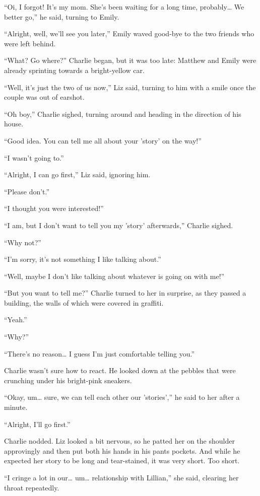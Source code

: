 “Oi, I forgot! It's my mom. She's been waiting for a long time, probably… We better go,” he said, turning to Emily.

“Alright, well, we'll see you later,” Emily waved good-bye to the two friends who were left behind.

“What? Go where?” Charlie began, but it was too late: Matthew and Emily were already sprinting towards a bright-yellow car.

“Well, it's just the two of us now,” Liz said, turning to him with a smile once the couple was out of earshot.

“Oh boy,” Charlie sighed, turning around and heading in the direction of his house.

“Good idea. You can tell me all about your 'story' on the way!”

“I wasn't going to.”

“Alright, I can go first,” Liz said, ignoring him.

“Please don't.”

“I thought you were interested!”

“I am, but I don't want to tell you my 'story' afterwards,” Charlie sighed.

“Why not?”

“I'm sorry, it's not something I like talking about.”

“Well, maybe I don't like talking about whatever is going on with me!”

“But you want to tell me?” Charlie turned to her in surprise, as they passed a building, the walls of which were covered in graffiti.

“Yeah.”

“Why?”

“There's no reason… I guess I'm just comfortable telling you.”

Charlie wasn't sure how to react. He looked down at the pebbles that were crunching under his bright-pink sneakers.

“Okay, um… sure, we can tell each other our 'stories',” he said to her after a minute.

“Alright, I'll go first.”

Charlie nodded. Liz looked a bit nervous, so he patted her on the shoulder approvingly and then put both his hands in his pants pockets. And while he expected her story to be long and tear-stained, it was very short. Too short.

“I cringe a lot in our… um… relationship with Lillian,” she said, clearing her throat repeatedly.

